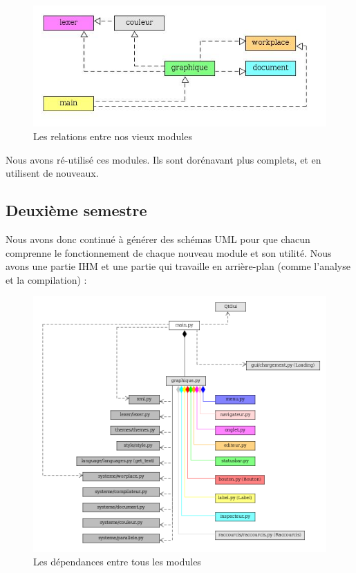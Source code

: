 \documentclass[a4paper,12pt]{article}
\begin{document}
\newpage
	
	\begin{figure}[h!]
			\begin{center}
				\includegraphics[scale=0.4]{images/imgs_uml/relations_modules.jpg}
				\caption{Les relations entre nos vieux modules}
			\end{center}
	\end{figure}
	
	Nous avons ré-utilisé ces modules. Ils sont dorénavant plus complets, et en utilisent de nouveaux.
	
	\subsection{Deuxième semestre}

Nous avons donc continué à générer des schémas UML pour que chacun comprenne le fonctionnement de chaque nouveau module et son utilité. Nous avons une partie IHM et une partie qui travaille en arrière-plan (comme l'analyse et la compilation) :

	\begin{figure}[h!]
		\begin{center}
			\includegraphics[scale=0.43]{images/imgs_uml/dependances_graphique.png}
				\caption{Les dépendances entre tous les modules}
		\end{center}
	\end{figure}
	
\end{document}
